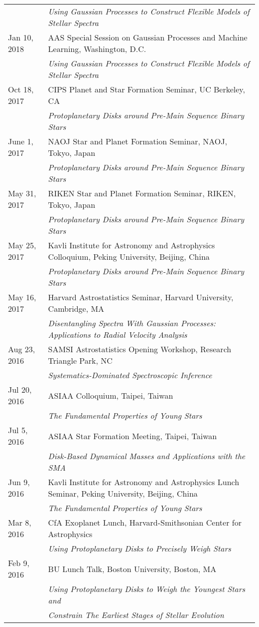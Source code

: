 \documentclass[10pt]{article}
\newcommand{\rowskip}{1.2mm}
\begin{document}
\begin{tabular*}{\textwidth}{@{\hspace{10pt}}p{1.2in}l}
  & \emph{Using Gaussian Processes to Construct Flexible Models of Stellar Spectra} \\[\rowskip]
  Jan 10, 2018 & AAS Special Session on Gaussian Processes and Machine Learning, Washington, D.C. \\
  & \emph{Using Gaussian Processes to Construct Flexible Models of Stellar Spectra}\\[\rowskip]
  Oct 18, 2017 & CIPS Planet and Star Formation Seminar, UC Berkeley, CA \\
  & \emph{Protoplanetary Disks around Pre-Main Sequence Binary Stars} \\[\rowskip]
  June 1, 2017 & NAOJ Star and Planet Formation Seminar, NAOJ, Tokyo, Japan \\
  & \emph{Protoplanetary Disks around Pre-Main Sequence Binary Stars} \\[\rowskip]
  May 31, 2017 & RIKEN Star and Planet Formation Seminar, RIKEN, Tokyo, Japan \\
  & \emph{Protoplanetary Disks around Pre-Main Sequence Binary Stars} \\[\rowskip]
  May 25, 2017 & Kavli Institute for Astronomy and Astrophysics Colloquium, Peking University, Beijing, China \\
  & \emph{Protoplanetary Disks around Pre-Main Sequence Binary Stars} \\[\rowskip]
  May 16, 2017 & Harvard Astrostatistics Seminar, Harvard University, Cambridge, MA \\
  & \emph{Disentangling Spectra With Gaussian Processes: Applications to Radial Velocity Analysis} \\[\rowskip]
  Aug 23, 2016 & SAMSI Astrostatistics Opening Workshop, Research Triangle Park, NC \\
  & \emph{Systematics-Dominated Spectroscopic Inference} \\[\rowskip]
  Jul 20, 2016 & ASIAA Colloquium, Taipei, Taiwan \\
  & \emph{The Fundamental Properties of Young Stars} \\[\rowskip]
  Jul 5, 2016 & ASIAA Star Formation Meeting, Taipei, Taiwan \\
  & \emph{Disk-Based Dynamical Masses and Applications with the SMA} \\[\rowskip]
  Jun 9, 2016 & Kavli Institute for Astronomy and Astrophysics Lunch Seminar, Peking University, Beijing, China \\
  & \emph{The Fundamental Properties of Young Stars} \\[\rowskip]
  Mar 8, 2016 & CfA Exoplanet Lunch, Harvard-Smithsonian Center for Astrophysics \\
  & \emph{Using Protoplanetary Disks to Precisely Weigh Stars} \\[\rowskip]
  Feb 9, 2016 & BU Lunch Talk, Boston University, Boston, MA \\
  & \emph{Using Protoplanetary Disks to Weigh the Youngest Stars and} \\
  & \emph{Constrain The Earliest Stages of Stellar Evolution} \\[\rowskip]
\end{tabular*}
\end{document}
